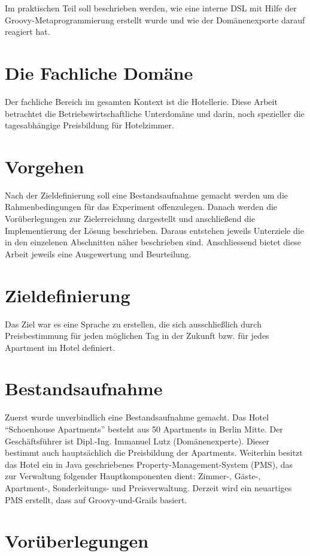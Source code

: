 \documentclass[11pt,english,ngerman, headsepline]{scrreprt}
\begin{document}
Im praktischen Teil soll beschrieben werden, wie eine interne DSL mit Hilfe der
Groovy-Metaprogrammierung erstellt wurde und wie der Domänenexporte darauf
reagiert hat. 

\section{Die Fachliche Domäne}
Der fachliche Bereich im gesamten Kontext ist die Hotellerie. Diese
Arbeit betrachtet die Betriebswirtschaftliche Unterdomäne
 und darin, noch spezieller die tagesabhängige Preisbildung für Hotelzimmer.

\section{Vorgehen}
Nach der Zieldefinierung soll eine Bestandsaufnahme gemacht werden um die
Rahmenbedingungen für das Experiment offenzulegen. Danach werden die
Vorüberlegungen zur Zielerreichung dargestellt und anschließend die
Implementierung der Lösung beschrieben. Daraus entstehen jeweils Unterziele die
in den einzelenen Abschnitten näher beschrieben sind. Anschliessend bietet diese
Arbeit jeweils eine Ausgewertung und Beurteilung.

\section{Zieldefinierung}
Das Ziel war es eine Sprache zu erstellen, die sich ausschließlich durch
Preisbestimmung für jeden möglichen Tag in der Zukunft bzw. für jedes Apartment
im Hotel definiert.

\section{Bestandsaufnahme}
Zuerst wurde unverbindlich eine Bestandsaufnahme gemacht. Das Hotel
``Schoenhouse Apartments'' besteht aus 50 Apartments in Berlin Mitte. Der
Geschäftsführer ist Dipl.-Ing. Immanuel Lutz (Domänenexperte). Dieser bestimmt
auch hauptsächlich die Preisbildung der Apartments. Weiterhin besitzt das Hotel ein in Java
geschriebenes Property-Management-System (PMS), das zur Verwaltung folgender
Hauptkomponenten dient: Zimmer-, Gäste-, Apartment-, Sonderleitungs- und
Preisverwaltung.
Derzeit wird ein neuartiges PMS erstellt, dass auf Groovy-und-Grails basiert.
 
 \section{Vorüberlegungen}
\end{document}
